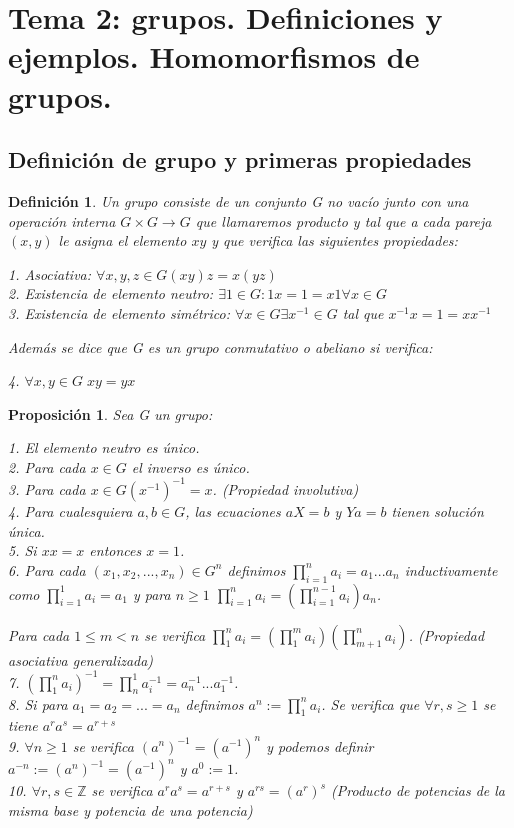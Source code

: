 \documentclass{article}
\theoremstyle{theorem-style}  %
\newtheorem{proposition}[theorem]{Proposición}
\theoremstyle{definition-style}
\newtheorem{definition}{Definición}[section]
\theoremstyle{example-style}
\begin{document}
\newpage
\section{Tema 2: grupos. Definiciones y ejemplos. Homomorfismos de grupos.}

\subsection{Definición de grupo y primeras propiedades}

\begin{definition}
Un grupo consiste de un conjunto G no vacío junto con una operación interna $G \times G \rightarrow G$ que llamaremos producto y tal que a cada pareja $(x,y)$ le asigna el elemento $xy$ y que verifica las siguientes propiedades:

1. Asociativa: $\forall x,y,z \in G (xy)z = x(yz)$ \\
2. Existencia de elemento neutro: $\exists 1 \in G : 1x = 1 = x1 \forall x \in G$ \\
3. Existencia de elemento simétrico: $\forall x \in G \exists x^{-1} \in G$ tal que $x^{-1}x = 1 = xx^{-1}$ 

Además se dice que G es un grupo conmutativo o abeliano si verifica:

4. $\forall x,y \in G \; xy = yx$
\end{definition}

\begin{proposition}
Sea G un grupo:

1. El elemento neutro es único. \\
2. Para cada $x \in G$ el inverso es único. \\
3. Para cada $x \in G (x^{-1})^{-1} = x$. (Propiedad involutiva) \\
4. Para cualesquiera $a,b \in G$, las ecuaciones $aX = b$ y $Ya = b$ tienen solución única. \\
5. Si $xx = x$ entonces $x=1$. \\
6. Para cada $(x_1,x_2,...,x_n) \in G^{n}$ definimos $\prod_{i=1}^{n} a_i = a_1...a_n$ inductivamente como $\prod_{i=1}^{1} a_i = a_1$ y para $n \geq 1$ $\prod_{i=1}^{n} a_i = (\prod_{i=1}^{n-1} a_i)a_n$.

Para cada $1 \leq m < n$ se verifica $\prod_{1}^{n} a_i = (\prod_{1}^{m} a_i)(\prod_{m+1}^{n} a_i)$. (Propiedad asociativa generalizada)\\
7. $(\prod_{1}^n a_i)^{-1} = \prod_{n}^{1} a_i^{-1} = a_n^{-1}...a_1^{-1}$. \\
8. Si para $a_1 = a_2 = ... = a_n$ definimos $a^n := \prod_{1}^{n} a_i$. Se verifica que $\forall r,s \ge 1$ se tiene $a^ra^s= a^{r+s}$  \\
9. $\forall n \ge 1$ se verifica $(a^n)^{-1} = (a^{-1})^n$ y podemos definir $a^{-n} := (a^n)^{-1} = (a^{-1})^n$ y $a^0 := 1$. \\
10. $\forall r,s \in \mathbb{Z}$ se verifica $a^ra^s = a^{r+s}$ y $a^{rs} = (a^r)^s$ (Producto de potencias de la misma base y potencia de una potencia)
\end{proposition}
\end{document}
